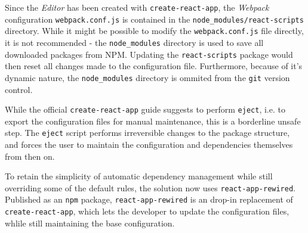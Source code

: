 Since the \textit{Editor} has been created with \texttt{create-react-app}, the \textit{Webpack} configuration \texttt{webpack.conf.js} is contained in the \verb|node_modules/react-scripts| directory.
While it might be possible to modify the \texttt{webpack.conf.js} file directly, it is not recommended - the \verb|node_modules| directory is used to save all downloaded packages from NPM.
Updating the \texttt{react-scripts} package would then reset all changes made to the configuration file.
Furthermore, because of it's dynamic nature, the \verb|node_modules| directory is ommited from the \texttt{git} version control.

While the official \texttt{create-react-app} guide suggests to perform \texttt{eject}, i.e. to export the configuration files for manual maintenance, this is a borderline unsafe step. 
The \texttt{eject} script performs irreversible changes to the package structure, and forces the user to maintain the configuration and dependencies themselves from then on.

To retain the simplicity of automatic dependency management while still overriding some of the default rules, the solution now uses \texttt{react-app-rewired}.
Published as an \texttt{npm} package, \texttt{react-app-rewired} is an drop-in replacement of \texttt{create-react-app}, which lets the developer to update the configuration files, whlile still maintaining the base configuration.




